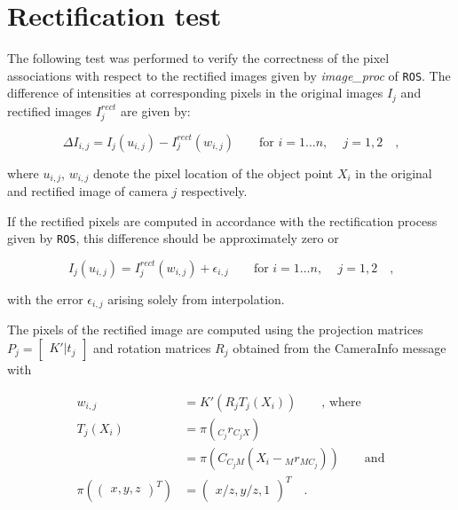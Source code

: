 \section{Rectification test}

The following test was performed to verify the correctness of the pixel
associations with respect to the rectified images given by \textit{image\_proc}
of \texttt{ROS}.
The difference of intensities at corresponding pixels in the original images $I_{j}$ and rectified images $I_{j}^{rect}$ are given by:

\begin{equation}
  \Delta I_{i,j} = I_j(u_{i,j}) - I_j^{rect}(w_{i,j}) 
  \hspace{2em} \text{for } i = 1 \ldots n \text{, } \hspace{1em} j = 1,2
  \hspace{1em}\text{,}
  \label{eqn:rect/I_def}
\end{equation}

where $u_{i,j}$, $w_{i,j}$ denote the pixel location of the object point $X_i$ in the
original and rectified image of camera $j$ respectively.

If the rectified pixels are computed in accordance with the rectification
process given by \texttt{ROS}, this difference should be
approximately zero or

\begin{equation}
  I_j(u_{i,j}) = I_j^{rect}(w_{i,j}) + \epsilon_{i,j} 
  \hspace{2em} \text{for } i = 1 \ldots n \text{, } \hspace{1em} j = 1,2
  \hspace{1em}\text{,}
  \label{eqn:rect/diffI_eq}
\end{equation}

with the error $\epsilon_{i,j}$ arising solely from interpolation.

The pixels of the rectified image are computed using the projection matrices
$P_{j} = \begin{bmatrix} K' | t_j \end{bmatrix}$ and rotation matrices $R_j$ 
obtained from the CameraInfo message with \cite{Pipeline}

\begin{align}
  w_{i,j} &= K'(R_j T_j(X_i)) \hspace{2em} \text{, where} \\
  T_j(X_i) &= \pi(_{C_j}r_{C_jX}) \\
           &= \pi(C_{C_j M} (X_i - {_M}r_{MC_j})) \hspace{2em} \text{and} \\
  \pi(\begin{pmatrix} x, y, z \end{pmatrix}^T) &= 
  \begin{pmatrix} x/z, y/z, 1 \end{pmatrix}^T 
  \hspace{1em}\text{.}
  \label{eqn:rect/utilde_def}
\end{align}

